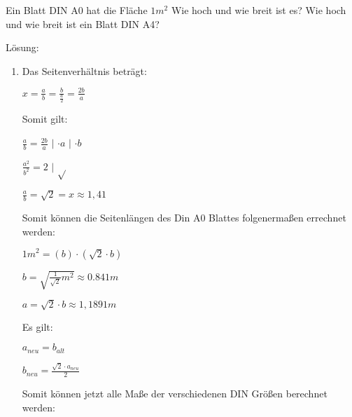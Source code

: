 \documentclass[../main.tex]{subfiles}
\begin{document}
\begin{enumerate}
	      Ein Blatt DIN A0 hat die Fläche \(
	      1 m^2
	      \)
	      Wie hoch und wie breit ist es?
	      Wie hoch und wie breit ist ein Blatt DIN A4?

	      Lösung:
	      \begin{enumerate}
		      \item Das Seitenverhältnis beträgt:

		            \(
		            x = \frac{a}{b}
		            = \frac{b}{
			            \frac{a}{2}
		            }
		            = \frac{2b}{a}
		            \)

		            Somit gilt:

		            \(
		            \frac{a}{b} = \frac{2b}{a}
		            \)
		            \(|\)
		            \(
		            \cdot a
		            \)
		            \(|\)
		            \(
		            \cdot b
		            \)

		            \(
		            \frac{a^2}{b^2} = 2
		            \)
		            \(|\)
		            \(
		            \sqrt{}
		            \)

		            \(
		            \frac{a}{b}
		            = \sqrt{2}
		            = x
		            \approx 1,41
		            \)

		            Somit können die Seitenlängen des Din A0 Blattes folgenermaßen
		            errechnet werden:

		            \(
		            1 m^2
		            = (b) \cdot (\sqrt{2} \cdot b)
		            \)

		            \(
		            b = \sqrt{
			            \frac{1}{\sqrt{2}} m^2
		            }
		            \approx 0.841 m
		            \)

		            \(
		            a = \sqrt{2} \cdot b
		            \approx 1,1891 m
		            \)

		            Es gilt:

		            \(
		            a_{neu} = b_{alt}
		            \)

		            \(
		            b_{neu} = \frac{ \sqrt{2} \cdot a_{neu}}{ 2 }
		            \)

		            Somit können jetzt alle Maße der verschiedenen DIN Größen berechnet werden:


\end{enumerate}
\end{enumerate}
\end{document}
